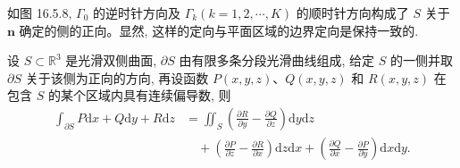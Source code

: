 如图 16.5.8, $\Gamma_0$ 的逆时针方向及 $\Gamma_k(k=1,2,\cdots,K)$ 的顺时针方向构成了 $S$ 关于 $\boldsymbol n$ 确定的侧的正向。显然, 这样的定向与平面区域的边界定向是保持一致的.

\begin{theorem}[{斯托克斯公式}]\label{theorem:ma-16-5-3}
设 $S\subset\mathbb R^3$ 是光滑双侧曲面, $\partial S$ 由有限多条分段光滑曲线组成, 给定 $S$ 的一侧并取 $\partial S$ 关于该侧为正向的方向, 再设函数 $P(x,y,z)$、$Q(x,y,z)$ 和 $R(x,y,z)$ 在包含 $S$ 的某个区域内具有连续偏导数, 则
\[
\begin{aligned}
  \int_{\partial S}P\mathrm dx+Q\mathrm dy+R\mathrm dz
  &=\iint_S\left(\frac{\partial R}{\partial y}-\frac{\partial Q}{\partial z}\right)\mathrm dy\mathrm dz\\
  &\quad+\left(\frac{\partial P}{\partial z}-\frac{\partial R}{\partial x}\right)\mathrm dz\mathrm dx
    +\left(\frac{\partial Q}{\partial x}-\frac{\partial P}{\partial y}\right)\mathrm dx\mathrm dy.
\end{aligned}
\]
\end{theorem}


